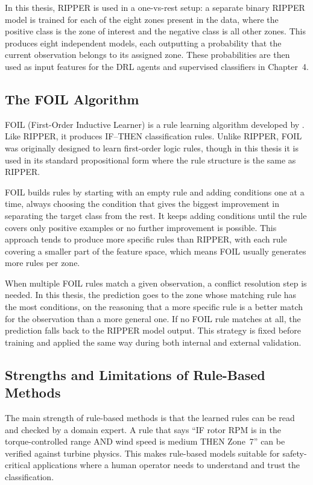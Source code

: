 In this thesis, RIPPER is used in a one-vs-rest setup: a separate binary RIPPER model is
trained for each of the eight zones present in the data, where the positive class is the
zone of interest and the negative class is all other zones. This produces eight
independent models, each outputting a probability that the current observation belongs to
its assigned zone. These probabilities are then used as input features for the DRL agents
and supervised classifiers in Chapter~4.

\subsection{The FOIL Algorithm}
\label{subsec:bg:foil}

FOIL (First-Order Inductive Learner) is a rule learning algorithm developed by
\citet{quinlan1990}. Like RIPPER, it produces IF--THEN classification rules. Unlike
RIPPER, FOIL was originally designed to learn first-order logic rules, though in this
thesis it is used in its standard propositional form where the rule structure is the same
as RIPPER.

FOIL builds rules by starting with an empty rule and adding conditions one at a time,
always choosing the condition that gives the biggest improvement in separating the target
class from the rest. It keeps adding conditions until the rule covers only positive
examples or no further improvement is possible. This approach tends to produce more
specific rules than RIPPER, with each rule covering a smaller part of the feature space,
which means FOIL usually generates more rules per zone.

When multiple FOIL rules match a given observation, a conflict resolution step is needed.
In this thesis, the prediction goes to the zone whose matching rule has the most
conditions, on the reasoning that a more specific rule is a better match for the
observation than a more general one. If no FOIL rule matches at all, the prediction falls
back to the RIPPER model output. This strategy is fixed before training and applied the
same way during both internal and external validation.

\subsection{Strengths and Limitations of Rule-Based Methods}
\label{subsec:bg:rules:limits}

The main strength of rule-based methods is that the learned rules can be read and checked
by a domain expert. A rule that says ``IF rotor RPM is in the torque-controlled range AND
wind speed is medium THEN Zone~7'' can be verified against turbine physics. This makes
rule-based models suitable for safety-critical applications where a human operator needs
to understand and trust the classification.

